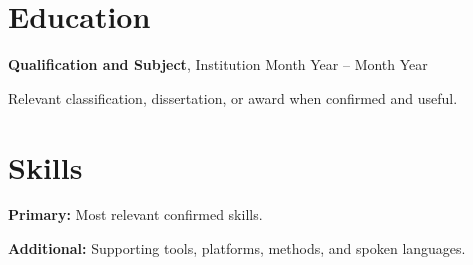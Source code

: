 \documentclass[10pt,a4paper]{article}
\begin{document}
\section{Education}
\textbf{Qualification and Subject}, Institution \hfill Month Year -- Month Year\par
Relevant classification, dissertation, or award when confirmed and useful.

\section{Skills}
\textbf{Primary:} Most relevant confirmed skills.\par
\textbf{Additional:} Supporting tools, platforms, methods, and spoken languages.
\end{document}
